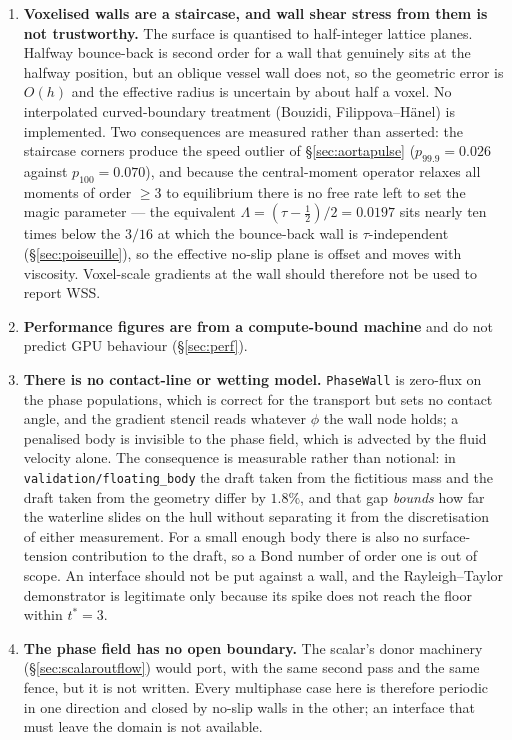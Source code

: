 \documentclass[11pt,a4paper]{article}
\newcommand{\code}[1]{\texttt{\small #1}}
\begin{document}
\begin{enumerate}[leftmargin=1.4em,itemsep=4pt]
\item \textbf{Voxelised walls are a staircase, and wall shear stress from them
  is not trustworthy.} The surface is quantised to half-integer lattice planes.
  Halfway bounce-back is second order for a wall that genuinely sits at the
  halfway position, but an oblique vessel wall does not, so the geometric error
  is $O(h)$ and the effective radius is uncertain by about half a voxel. No
  interpolated curved-boundary treatment (Bouzidi, Filippova--H\"anel) is
  implemented. Two consequences are measured rather than asserted: the staircase
  corners produce the speed outlier of \S\ref{sec:aortapulse}
  ($p_{99.9}=0.026$ against $p_{100}=0.070$), and because the central-moment
  operator relaxes all moments of order $\ge 3$ to equilibrium there is no free
  rate left to set the magic parameter --- the equivalent
  $\Lambda = (\tau-\tfrac12)/2 = 0.0197$ sits nearly ten times below the $3/16$
  at which the bounce-back wall is $\tau$-independent
  (\S\ref{sec:poiseuille}), so the effective no-slip plane is offset and moves
  with viscosity. Voxel-scale gradients at the wall should therefore not be used
  to report WSS.

\item \textbf{Performance figures are from a compute-bound machine} and do not
  predict GPU behaviour (\S\ref{sec:perf}).

\item \textbf{There is no contact-line or wetting model.} \code{PhaseWall} is
  zero-flux on the phase populations, which is correct for the transport but sets
  no contact angle, and the gradient stencil reads whatever $\phi$ the wall node
  holds; a penalised body is invisible to the phase field, which is advected by
  the fluid velocity alone. The consequence is measurable rather than notional:
  in \code{validation/floating\_body} the draft taken from the fictitious mass
  and the draft taken from the geometry differ by $1.8\%$, and that gap
  \emph{bounds} how far the waterline slides on the hull without separating it
  from the discretisation of either measurement. For a small enough body there
  is also no surface-tension contribution to the draft, so a Bond number of
  order one is out of scope. An interface should not be put against a wall, and
  the Rayleigh--Taylor demonstrator is legitimate only because its spike does
  not reach the floor within $t^{*}=3$.

\item \textbf{The phase field has no open boundary.} The scalar's donor
  machinery (\S\ref{sec:scalaroutflow}) would port, with the same second pass
  and the same fence, but it is not written. Every multiphase case here is
  therefore periodic in one direction and closed by no-slip walls in the other;
  an interface that must leave the domain is not available.


\end{enumerate}
\end{document}
